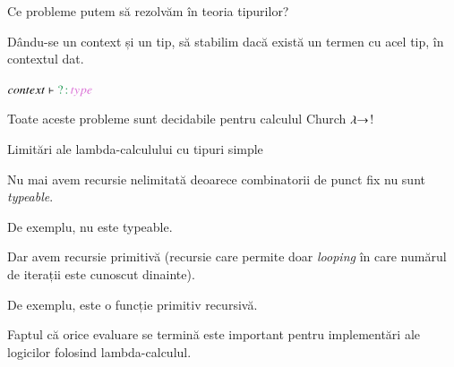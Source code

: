 \documentclass[xcolor=pdftex,romanian,colorlinks]{beamer}
\begin{document}
\begin{frame}{Ce probleme putem să rezolvăm în teoria tipurilor?}



Dându-se un context și un tip, să stabilim dacă există un termen cu acel tip, în contextul dat.
\vspace{-.3cm}
\begin{center}
$context \vdash \type{?}{type}$
\end{center}

\begin{center}
\alert{Toate aceste probleme sunt decidabile pentru calculul Church $\lambda\hspace{-.1cm}\to$!}
\end{center}
\end{frame}

\begin{frame}[fragile]{Limitări ale lambda-calculului cu tipuri simple}

{\color{False}Nu mai avem recursie nelimitată} deoarece combinatorii de punct fix nu sunt \textit{typeable}.

De exemplu,   nu este typeable.

\vspace{.6cm}
Dar {\color{True}avem recursie primitivă} (recursie care permite doar \textit{looping} în care numărul de iterații este cunoscut dinainte). %

De exemplu,  este o funcție primitiv recursivă.

Faptul că orice evaluare se termină este important pentru implementări ale logicilor folosind lambda-calculul.

\end{frame}
\end{document}
